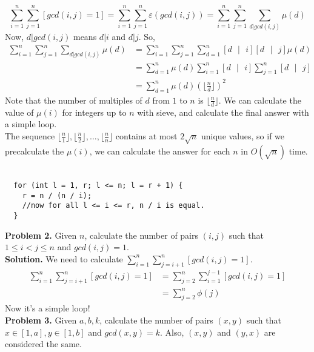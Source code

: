 \documentclass[11pt]{article}
\begin{document}
  $$\sum_{i = 1}^{n} \sum_{j = 1}^{n} [gcd(i, j) = 1] = \sum_{i = 1}^{n} \sum_{j = 1}^{n} \varepsilon(gcd(i, j)) = \sum_{i = 1}^{n} \sum_{j = 1}^{n} \sum_{d | gcd(i, j)} \mu(d)$$
Now, $d|gcd(i, j)$ means $d | i$ and $d|j$. So, 
\begin{align*}
\sum_{i = 1}^{n} \sum_{j = 1}^{n} \sum_{d | gcd(i, j)} \mu(d) &= \sum_{i = 1}^{n} \sum_{j = 1}^{n} \sum_{d = 1}^{n} [d \text{ } | \text{ } i] [d \text{ }| \text{ } j] \mu(d)\\
                                                              &= \sum_{d = 1}^{n} \mu(d) \sum_{i = 1}^{n} [d \text{ }|\text{ } i] \sum_{j = 1}^{n} [d \text{ }|\text{ } j] \\
                                                              &= \sum_{d = 1}^{n} \mu(d) {(\lfloor \frac{n}{d} \rfloor)}^2
\end{align*}
Note that the number of multiples of $d$ from $1$ to $n$ is $\lfloor \frac{n}{d} \rfloor$. We can calculate the value of $\mu(i)$ for integers up to $n$ with sieve, and calculate the final answer with a simple loop. \\
The sequence $\lfloor \frac{n}{1} \rfloor, \lfloor \frac{n}{2} \rfloor, \dots, \lfloor \frac{n}{n} \rfloor$ contains at most $2\sqrt{n}$ unique values, so if we precalculate the $\mu(i)$, we can calculate the answer for each $n$ in $O(\sqrt{n})$ time.\\ \\
\begin{verbatim}
  for (int l = 1, r; l <= n; l = r + 1) {
    r = n / (n / i);
    //now for all l <= i <= r, n / i is equal.
  }
\end{verbatim}
\textbf{Problem 2.} Given $n$, calculate the number of pairs $(i, j)$ such that $1 \leq i < j \leq n$ and $gcd(i, j) = 1$.\\
\textbf{Solution.} We need to calculate $\sum_{i = 1}^{n} \sum_{j = i + 1}^{n} [gcd(i, j) = 1]$. \\
\begin{align*}
  \sum_{i = 1}^{n} \sum_{j = i + 1}^{n} [gcd(i, j) = 1] &= \sum_{j = 2}^{n} \sum_{i = 1}^{j - 1} [gcd(i, j) = 1]\\
                                                        &= \sum_{j = 2}^{n} \phi(j)
\end{align*}
Now it's a simple loop!\\
\textbf{Problem 3.} Given $a, b, k$, calculate the number of pairs $(x, y)$ such that $x \in [1, a], y \in [1, b]$ and $gcd(x, y) = k$. Also, $(x, y)$ and $(y, x)$ are considered the same.\\
\end{document}
